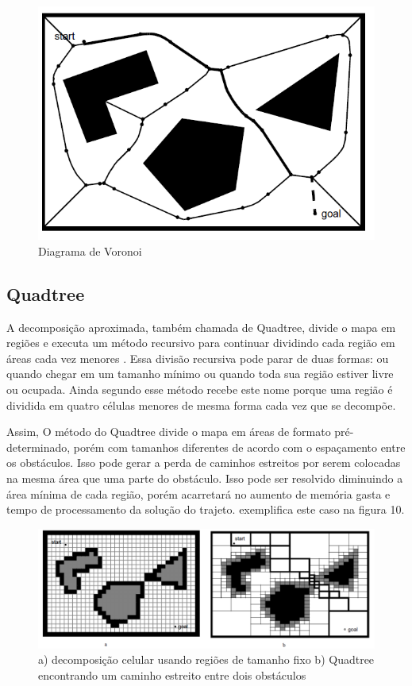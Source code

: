 \begin{figure}[h]
	\centering
	\label{fig09}
		\includegraphics[keepaspectratio=true,scale=0.6]{figuras/8voronoi.png}
	\caption{Diagrama de Voronoi \cite{Siegwart2004}}
\end{figure}

\subsection{Quadtree}

A decomposição aproximada, também chamada de Quadtree, divide o mapa em regiões e executa um método recursivo para continuar dividindo cada região em áreas cada vez menores \cite{Thomsen2010}. Essa divisão recursiva pode parar de duas formas: ou quando chegar em um tamanho mínimo ou quando toda sua região estiver livre ou ocupada. Ainda segundo \cite{Thomsen2010} esse método recebe este nome porque uma região é dividida em quatro células menores de mesma forma cada vez que se decompõe.

Assim, O método do Quadtree divide o mapa em áreas de formato pré-determinado, porém com tamanhos diferentes de acordo com o espaçamento entre os obstáculos. Isso pode gerar a perda de caminhos estreitos por serem colocadas na mesma área que uma parte do obstáculo. Isso pode ser resolvido diminuindo a área mínima de cada região, porém acarretará no aumento de memória gasta e tempo de processamento da solução do trajeto. \cite{Siegwart2004} exemplifica este caso na figura 10.

\begin{figure}[h]
	\centering
	\label{fig10}
		\includegraphics[keepaspectratio=true,scale=0.5]{figuras/9quadtree.png}
	\caption{ a) decomposição celular usando regiões de tamanho fixo b) Quadtree encontrando um caminho estreito entre dois obstáculos \cite{Siegwart2004}}
\end{figure}

